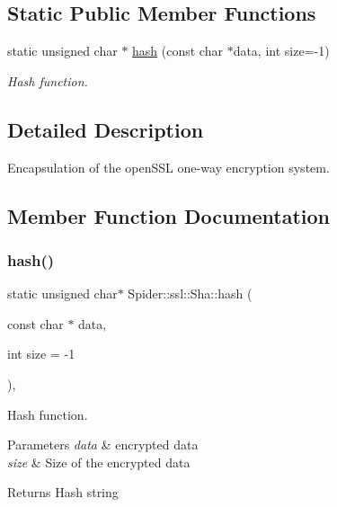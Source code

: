 \subsection*{Static Public Member Functions}
\begin{DoxyCompactItemize}
\item 
static unsigned char $\ast$ \hyperlink{class_spider_1_1ssl_1_1_sha_a7020bae9ea9d983f87d36f1ecc1c1f06}{hash} (const char $\ast$data, int size=-\/1)
\begin{DoxyCompactList}\small\item\em Hash function. \end{DoxyCompactList}\end{DoxyCompactItemize}


\subsection{Detailed Description}
Encapsulation of the open\+S\+SL one-\/way encryption system. 

\subsection{Member Function Documentation}
\mbox{\label{class_spider_1_1ssl_1_1_sha_a7020bae9ea9d983f87d36f1ecc1c1f06}} 
\subsubsection{\texorpdfstring{hash()}{hash()}}
{\footnotesize\ttfamily static unsigned char$\ast$ Spider\+::ssl\+::\+Sha\+::hash (\begin{DoxyParamCaption}\item[{const char $\ast$}]{data,  }\item[{int}]{size = {\ttfamily -\/1} }\end{DoxyParamCaption})\hspace{0.3cm}{\ttfamily [inline]}, {\ttfamily [static]}}



Hash function. 


\begin{DoxyParams}{Parameters}
{\em data} & encrypted data \\
\hline
{\em size} & Size of the encrypted data \\
\hline
\end{DoxyParams}
\begin{DoxyReturn}{Returns}
Hash string 
\end{DoxyReturn}
\mbox{\label{class_spider_1_1ssl_1_1_sha_a92e690d4b4c94f11d5be4f1d42bc2898}} 
